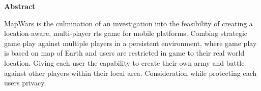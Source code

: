 \thispagestyle{empty}

\begin{center}
    {\LARGE\bf Abstract}
\end{center}

MapWars is the culmination of an investigation into the feasibility of creating a location-aware, multi-player \gls{rts} game for mobile platforms. Combing strategic game play against multiple players in a persistent environment, where game play is based on map of Earth and users are restricted in game to their real world location. Giving each user the capability to create their own army and battle against other players within their local area. Consideration while protecting each users privacy.	